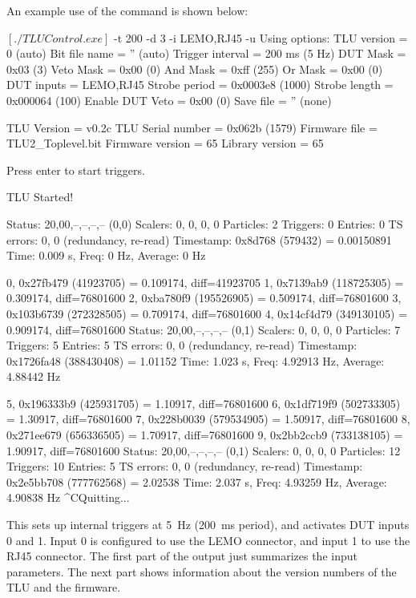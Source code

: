 An example use of the command is shown below:

\begin{listing}[mybash]
$[./TLUControl.exe]$ -t 200 -d 3 -i LEMO,RJ45 -u
Using options:
TLU version = 0 (auto)
Bit file name = '' (auto)
Trigger interval = 200 ms (5 Hz)
DUT Mask  = 0x03 (3)
Veto Mask = 0x00 (0)
And Mask  = 0xff (255)
Or Mask   = 0x00 (0)
DUT inputs = LEMO,RJ45
Strobe period = 0x0003e8 (1000)
Strobe length = 0x000064 (100)
Enable DUT Veto = 0x00 (0)
Save file = '' (none)

TLU Version = v0.2c
TLU Serial number = 0x062b (1579)
Firmware file = TLU2_Toplevel.bit
Firmware version = 65
Library version = 65

Press enter to start triggers.

TLU Started!

Status:    20,00,--,--,--,-- (0,0)
Scalers:   0, 0, 0, 0
Particles: 2
Triggers:  0
Entries:   0
TS errors: 0, 0 (redundancy, re-read)
Timestamp: 0x8d768 (579432) = 0.00150891
Time: 0.009 s, Freq: 0 Hz, Average: 0 Hz

        0, 0x27fb479 (41923705) = 0.109174, diff=41923705
        1, 0x7139ab9 (118725305) = 0.309174, diff=76801600
        2, 0xba780f9 (195526905) = 0.509174, diff=76801600
        3, 0x103b6739 (272328505) = 0.709174, diff=76801600
        4, 0x14cf4d79 (349130105) = 0.909174, diff=76801600
Status:    20,00,--,--,--,-- (0,1)
Scalers:   0, 0, 0, 0
Particles: 7
Triggers:  5
Entries:   5
TS errors: 0, 0 (redundancy, re-read)
Timestamp: 0x1726fa48 (388430408) = 1.01152
Time: 1.023 s, Freq: 4.92913 Hz, Average: 4.88442 Hz

        5, 0x196333b9 (425931705) = 1.10917, diff=76801600
        6, 0x1df719f9 (502733305) = 1.30917, diff=76801600
        7, 0x228b0039 (579534905) = 1.50917, diff=76801600
        8, 0x271ee679 (656336505) = 1.70917, diff=76801600
        9, 0x2bb2ccb9 (733138105) = 1.90917, diff=76801600
Status:    20,00,--,--,--,-- (0,1)
Scalers:   0, 0, 0, 0
Particles: 12
Triggers:  10
Entries:   5
TS errors: 0, 0 (redundancy, re-read)
Timestamp: 0x2e5bb708 (777762568) = 2.02538
Time: 2.037 s, Freq: 4.93259 Hz, Average: 4.90838 Hz
^CQuitting...
\end{listing}

This sets up internal triggers at 5~Hz (200~ms period), and activates DUT inputs 0 and 1.
Input 0 is configured to use the LEMO connector, and input 1 to use the RJ45 connector.
The first part of the output just summarizes the input parameters.
The next part shows information about the version numbers of the TLU and the firmware.

